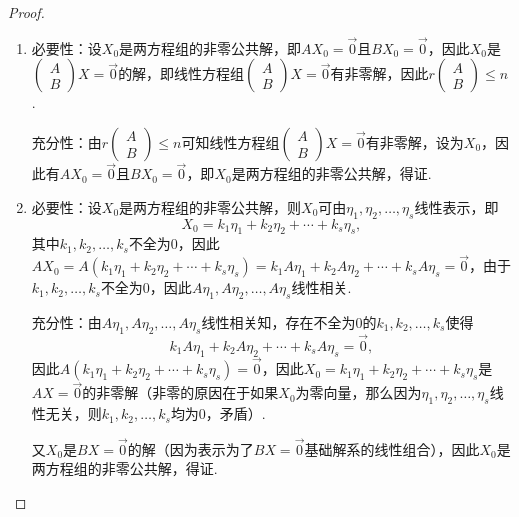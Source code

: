 \begin{proof}
    \begin{enumerate}
        \item 必要性：设$X_0$是两方程组的非零公共解，即$AX_0=\vec{0}$且$BX_0=\vec{0}$，因此$X_0$是$\begin{pmatrix}
                      A \\ B
                  \end{pmatrix}X=\vec{0}$的解，即线性方程组$\begin{pmatrix}
                      A \\ B
                  \end{pmatrix}X=\vec{0}$有非零解，因此$r\begin{pmatrix}
                      A \\ B
                  \end{pmatrix}\leqslant n$.

              充分性：由$r\begin{pmatrix}
                      A \\ B
                  \end{pmatrix}\leqslant n$可知线性方程组$\begin{pmatrix}
                      A \\ B
                  \end{pmatrix}X=\vec{0}$有非零解，设为$X_0$，因此有$AX_0=\vec{0}$且$BX_0=\vec{0}$，即$X_0$是两方程组的非零公共解，得证.

        \item 必要性：设$X_0$是两方程组的非零公共解，则$X_0$可由$\eta_1,\eta_2,\ldots,\eta_s$线性表示，即
              \[X_0=k_1\eta_1+k_2\eta_2+\cdots+k_s\eta_s,\]
              其中$k_1,k_2,\ldots,k_s$不全为0，因此$AX_0=A(k_1\eta_1+k_2\eta_2+\cdots+k_s\eta_s)=k_1A\eta_1+k_2A\eta_2+\cdots+k_sA\eta_s=\vec{0}$，由于$k_1,k_2,\ldots,k_s$不全为0，因此$A\eta_1,A\eta_2,\ldots,A\eta_s$线性相关.

              充分性：由$A\eta_1,A\eta_2,\ldots,A\eta_s$线性相关知，存在不全为0的$k_1,k_2,\ldots,k_s$使得
              \[k_1A\eta_1+k_2A\eta_2+\cdots+k_sA\eta_s=\vec{0},\]
              因此$A(k_1\eta_1+k_2\eta_2+\cdots+k_s\eta_s)=\vec{0}$，因此$X_0=k_1\eta_1+k_2\eta_2+\cdots+k_s\eta_s$是$AX=\vec{0}$的非零解（非零的原因在于如果$X_0$为零向量，那么因为$\eta_1,\eta_2,\ldots,\eta_s$线性无关，则$k_1,k_2,\ldots,k_s$均为0，矛盾）.

              又$X_0$是$BX=\vec{0}$的解（因为表示为了$BX=\vec{0}$基础解系的线性组合），因此$X_0$是两方程组的非零公共解，得证.


\end{enumerate}
\end{proof}

